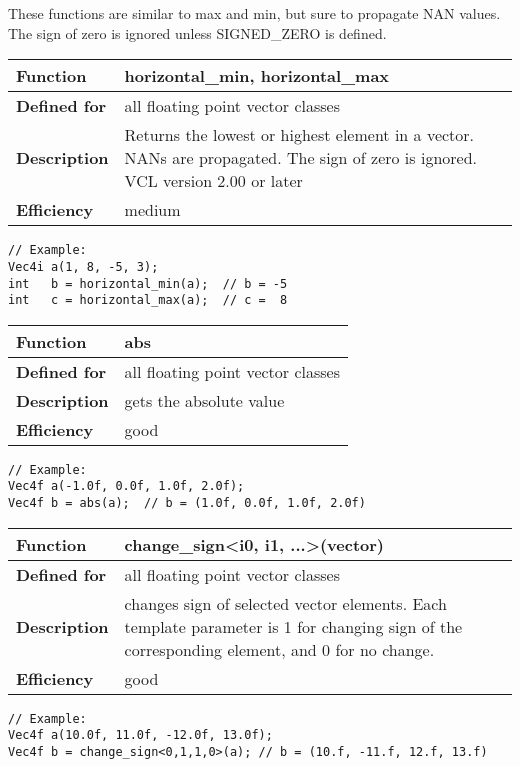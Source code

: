 \documentclass[vcl_manual.tex]{subfiles}
\begin{document}
These functions are similar to max and min, but sure to propagate NAN values.\\
The sign of zero is ignored unless SIGNED\_ZERO is defined.

\begin{tabular}{|p{25mm}|p{100mm}|}
\hline
\bfseries Function & horizontal\_min, horizontal\_max \\ \hline
\bfseries Defined for & all floating point vector classes \\ \hline
\bfseries Description & Returns the lowest or highest element in a vector.\newline
NANs are propagated. The sign of zero is ignored. \newline
VCL version 2.00 or later \\ \hline
\bfseries Efficiency & medium \\ \hline
\end{tabular}
\begin{lstlisting}[frame=none]
// Example:
Vec4i a(1, 8, -5, 3);
int   b = horizontal_min(a);  // b = -5
int   c = horizontal_max(a);  // c =  8
\end{lstlisting}


\begin{tabular}{|p{25mm}|p{100mm}|}
\hline
\bfseries Function & abs \\ \hline
\bfseries Defined for & all floating point vector classes \\ \hline
\bfseries Description & gets the absolute value \\ \hline
\bfseries Efficiency & good \\ \hline
\end{tabular}
\begin{lstlisting}[frame=none]
// Example:
Vec4f a(-1.0f, 0.0f, 1.0f, 2.0f);
Vec4f b = abs(a);  // b = (1.0f, 0.0f, 1.0f, 2.0f)
\end{lstlisting}


\begin{tabular}{|p{25mm}|p{100mm}|}
\hline
\bfseries Function & change\_sign\textless i0, i1, ...\textgreater(vector) \\ \hline
\bfseries Defined for & all floating point vector classes \\ \hline
\bfseries Description & changes sign of selected vector elements.\newline
Each template parameter is 1 for changing sign of the corresponding element, and 0 for no change. \\ \hline
\bfseries Efficiency & good \\ \hline
\end{tabular}
\begin{lstlisting}[frame=none]
// Example:
Vec4f a(10.0f, 11.0f, -12.0f, 13.0f);
Vec4f b = change_sign<0,1,1,0>(a); // b = (10.f, -11.f, 12.f, 13.f)
\end{lstlisting}
\end{document}
